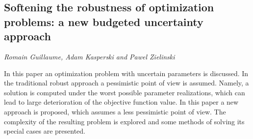 \documentclass[../booklet.tex]{subfiles}
\begin{document}
\subsection[Softening the robustness of optimization problems: a new budgeted uncertainty approach. {\it Romain Guillaume, Adam Kasperski and Pawel Zielinski}]{Softening the robustness of optimization problems: a new budgeted uncertainty approach}
  

\begin{center}
  {\it Romain Guillaume, Adam Kasperski and Pawel Zielinski}
\end{center}



In this paper an optimization problem with uncertain parameters is discussed. In the traditional robust approach a pessimistic point of view is assumed. Namely, a solution is computed under the worst possible parameter realizations, which can lead to large deterioration of the objective  function value. In this paper a new approach is proposed, which assumes a less pessimistic point of view.  The complexity of the resulting problem is explored and some methods of solving its special cases are presented.
\end{document}
